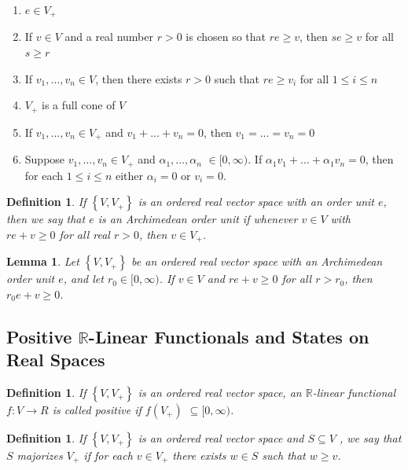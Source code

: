 \documentclass[aps,preprint]{revtex4}%
\newtheorem{definition}[theorem]{Definition}
\newtheorem{lemma}[theorem]{Lemma}
\begin{document}
\begin{enumerate}
\item $e\in V_{+}$

\item If $v\in V$ and a real number $r>0$ is chosen so that $re\geq v$, then
$se\geq v$ for all $s\geq r$

\item If $v_{1},...,v_{n}\in V$, then there exists $r>0$ such that $re\geq
v_{i}$ for all $1\leq i\leq n$

\item $V_{+}$ is a full cone of $V$ 

\item If $v_{1},...,v_{n}\in V_{+}$ and $v_{1}+...+v_{n}=0$, then
$v_{1}=...=v_{n}=0$ 

\item Suppose $v_{1},...,v_{n}\in V_{+}$ and $\alpha_{1},...,\alpha_{n}$
$\in\lbrack0,\infty)$. If $\alpha_{1}v_{1}+...+\alpha_{1}v_{n}=0$, then for
each $1\leq i\leq n$ either $\alpha_{i}=0$ or $v_{i}=0$. 
\end{enumerate}

\begin{definition}
If $\left\{  V,V_{+}\right\}  $ is an ordered real vector space with an order
unit $e$, then we say that $e$ is an Archimedean order unit if whenever $v\in
V$ with $re+v\geq0$ for all real $r>0$, then $v\in V_{+}$.
\end{definition}

\begin{lemma}
Let $\left\{  V,V_{+}\right\}  $ be an ordered real vector space with an
Archimedean order unit $e$, and let $r_{0}\in\lbrack0,\infty)$. If $v\in V$
and $re+v\geq0$ for all $r>r_{0}$, then $r_{0}e+v\geq0$.
\end{lemma}

\subsection{Positive $\mathbb{R}$-Linear Functionals and States on Real
Spaces}

\begin{definition}
If $\left\{  V,V_{+}\right\}  $ is an ordered real vector space, an
$\mathbb{R}$-linear functional $f:V\rightarrow R$ is called positive if
$f(V_{+})$ $\subseteq\lbrack0,\infty)$.
\end{definition}

\begin{definition}
If $\left\{  V,V_{+}\right\}  $ is an ordered real vector space and
$S\subseteq V$ , we say that $S$ \emph{majorizes} $V_{+}$ if for each $v\in
V_{+}$ there exists $w\in S$ such that $w\geq v$.
\end{definition}
\end{document}
